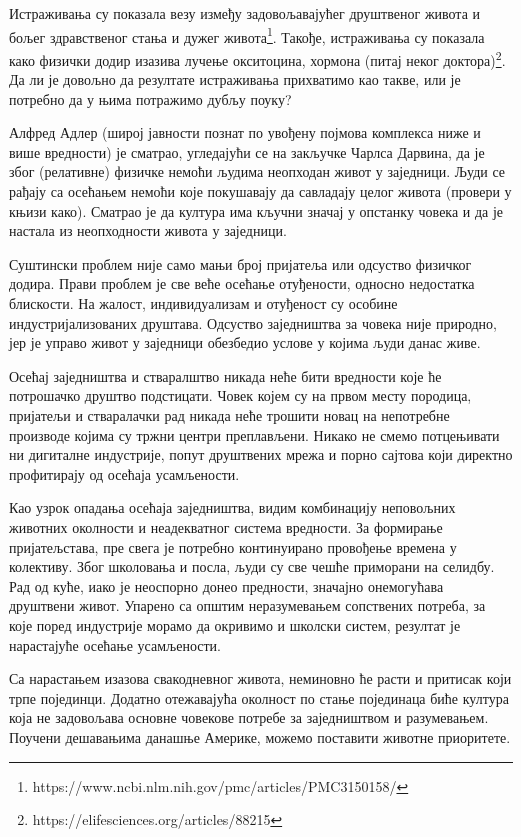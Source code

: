 \documentclass[b5paper]{article}
\begin{document}
Истраживања су показала везу између задовољавајућег друштвеног живота и бољег здравственог стања и дужег живота\footnote{https://www.ncbi.nlm.nih.gov/pmc/articles/PMC3150158/}. Такође, истраживања су показала како физички додир изазива лучење окситоцина, хормона (питај неког доктора)\footnote{https://elifesciences.org/articles/88215}. Да ли је довољно да резултате истраживања прихватимо као такве, или је потребно да у њима потражимо дубљу поуку?

Алфред Адлер (широј јавности познат по увођену појмова комплекса ниже и више вредности) је сматрао, угледајући се на закључке Чарлса Дарвина, да је због (релативне) физичке немоћи људима неопходан живот у заједници. Људи се рађају са осећањем немоћи које покушавају да савладају целог живота (провери у књизи како). Сматрао је да култура има кључни значај у опстанку човека и да је настала из неопходности живота у заједници.

Суштински проблем није само мањи број пријатеља или одсуство физичког додира. Прави проблем је све веће осећање отуђености, односно недостатка блискости. На жалост, индивидуализам и отуђеност су особине индустријализованих друштава. Одсуство заједништва за човека није природно, јер је управо живот у заједници обезбедио услове у којима људи данас живе.

Осећај заједништва и стваралштво никада неће бити вредности које ће потрошачко друштво подстицати. Човек којем су на првом месту породица, пријатељи и стваралачки рад никада неће трошити новац на непотребне производе којима су тржни  центри преплављени. Никако не смемо потцењивати ни дигиталне индустрије, попут друштвених мрежа и порно сајтова који директно профитирају од осећаја усамљености.

Као узрок опадања осећаја заједништва, видим комбинацију неповољних животних околности и неадекватног система вредности. За формирање пријатељстава, пре свега је потребно континуирано провођење времена у колективу. Због школовања и посла, људи су све чешће приморани на селидбу. Рад од куће, иако је неоспорно донео предности, значајно онемогућава друштвени живот. Упарено са општим неразумевањем сопствених потреба, за које поред индустрије морамо да окривимо и школски систем, резултат је нарастајуће осећање усамљености.

Са нарастањем изазова свакодневног живота, неминовно ће расти и притисак који трпе појединци. Додатно отежавајућа околност по стање појединаца биће култура која не задовољава основне човекове потребе за заједништвом и разумевањем. Поучени дешавањима данашње Америке, можемо поставити животне приоритете.
\end{document}
